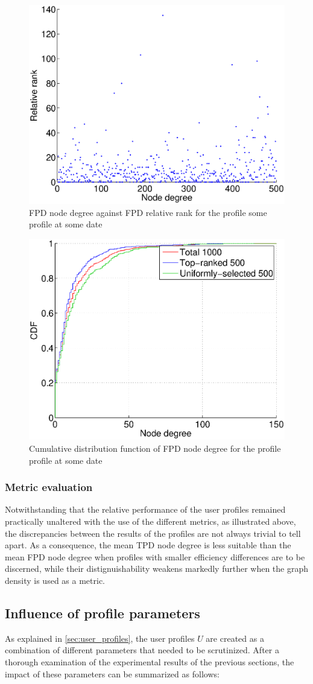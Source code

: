 \documentclass{sig-alternate}
\begin{document}
  \begin{figure}
 \centering
 \includegraphics[width=.45\textwidth]{figures/plots/scatterplot.eps}
 \caption{FPD node degree against FPD relative rank for the profile {\color{red} some profile at some date}}
 \label{fig:first_party_degree_relative_rank}
\end{figure}

\begin{figure}
 \centering
 \includegraphics[width=.45\textwidth]{figures/plots/cdf-first-node-degree.eps}
 \caption{Cumulative distribution function of FPD node degree for the profile {\color{red} profile at some date}}
 \label{fig:cdf_first_node_degree}
\end{figure}

\subsubsection{Metric evaluation}
Notwithstanding that the relative performance of the user profiles remained practically unaltered with the use of the different metrics, as illustrated above, the discrepancies between the results of the profiles are not always trivial to tell apart. As a consequence, the mean TPD node degree is less suitable than the mean FPD node degree when profiles with smaller efficiency differences are to be discerned, while their distignuishability weakens markedly further when the graph density is used as a metric.


\subsection{Influence of profile parameters}
As explained in \ref{sec:user_profiles}, the user profiles $U$ are created as a combination of different parameters that needed to be scrutinized. After a thorough examination of the experimental results of the previous sections, the impact of these parameters can be summarized as follows:
\end{document}
